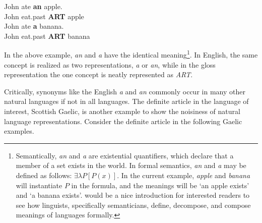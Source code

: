\begin{exe}  
\ex \gll John ate \textbf{an} apple.\\
	John eat.past	\textbf{ART} apple\\
\ex \gll John ate \textbf{a} banana.\\
	John eat.past   \textbf{ART} banana\\
\end{exe}

In the above example, \textit{an} and \textit{a} have the identical meaning\footnote{Semantically, \textit{an} and \textit{a} are existential quantifiers, which declare that a member of a set exists in the world. In formal semantics, \textit{an} and \textit{a} may be defined as follows: $\exists\lambda P[P(x)]$. In the current example, \textit{apple} and \textit{banana} will instantiate $P$ in the formula, and the meanings will be `an apple exists' and `a banana exists'. \citet{kratzer1998semantics} would be a nice introduction for interested readers to see how linguists, specifically semanticians, define, decompose, and compose meanings of languages formally.}. 
In English, the same concept is realized as two representations, \textit{a} or \textit{an}, while in the gloss representation the one concept is neatly represented as \textit{ART}. 

Critically, synonyms like the English \textit{a} and \textit{an} commonly occur in many other natural languages if not in all languages. The definite article in the language of interest, Scottish Gaelic, is another example to show the noisiness of natural language representations. Consider the definite article in the following Gaelic examples. 

